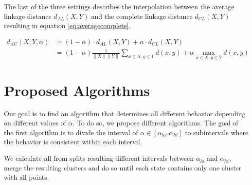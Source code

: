 The last of the three settings describes the interpolation between the average linkage distance $d_{AL}(X,Y)$ and the complete linkage distance $d_{CL}(X,Y)$ resulting in equation \ref{eq:averagecomplete}.

\begin{equation}
    \begin{aligned}
        d_{AC}(X,Y,\alpha) &= (1 - \alpha) \cdot d_{AL}(X,Y) + \alpha \cdot d_{CL}(X,Y)\\
        &= (1 - \alpha) \frac{1}{\|X\| \|Y\|}\sum\limits_{x \in X, y \in Y} d(x,y) + \alpha \max\limits_{x \in X, y \in Y} d(x,y)
    \end{aligned}
    \label{eq:averagecomplete}
\end{equation}


\section{Proposed Algorithms}

Our goal is to find an algorithm that determines all different behavior depending on different values of $\alpha$. To do so, we propose different algorithms. The goal of the first algorithm is to divide the interval of $\alpha \in [\alpha_{lo}, \alpha_{hi}]$ to subintervals where the behavior is consistent within each interval. 

\begin{algorithm}[H]
    \caption{We calculate all from splits resulting different intervals between $\alpha_{lo}$ and $\alpha_{hi}$, merge the resulting clusters and do so until each state contains only one cluster with all points.}
    \label{alg:alphalinkage1}
\end{algorithm}

